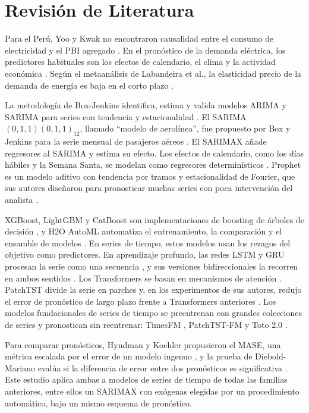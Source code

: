 \documentclass[conference]{IEEEtran}
\begin{document}
\section{Revisión de Literatura}

Para el Perú, Yoo y Kwak no encontraron causalidad entre el consumo de electricidad y el PBI agregado \cite{yoo2010}. En el pronóstico de la demanda eléctrica, los predictores habituales son los efectos de calendario, el clima y la actividad económica \cite{hong2016}. Según el metaanálisis de Labandeira et al., la elasticidad precio de la demanda de energía es baja en el corto plazo \cite{labandeira2017}.

La metodología de Box-Jenkins identifica, estima y valida modelos ARIMA y SARIMA para series con tendencia y estacionalidad \cite{box2015,hyndman2021}. El SARIMA$(0,1,1)(0,1,1)_{12}$, llamado ``modelo de aerolínea'', fue propuesto por Box y Jenkins para la serie mensual de pasajeros aéreos \cite{box2015}. El SARIMAX añade regresores al SARIMA y estima su efecto. Los efectos de calendario, como los días hábiles y la Semana Santa, se modelan como regresores determinísticos \cite{bell1983}. Prophet es un modelo aditivo con tendencia por tramos y estacionalidad de Fourier, que sus autores diseñaron para pronosticar muchas series con poca intervención del analista \cite{taylor2018}.

XGBoost, LightGBM y CatBoost son implementaciones de boosting de árboles de decisión \cite{chen2016,ke2017,prokhorenkova2018}, y H2O AutoML automatiza el entrenamiento, la comparación y el ensamble de modelos \cite{ledell2020}. En series de tiempo, estos modelos usan los rezagos del objetivo como predictores. En aprendizaje profundo, las redes LSTM y GRU procesan la serie como una secuencia \cite{hochreiter1997,cho2014}, y sus versiones bidireccionales la recorren en ambos sentidos \cite{schuster1997}. Los Transformers se basan en mecanismos de atención \cite{vaswani2017}. PatchTST divide la serie en parches y, en los experimentos de sus autores, redujo el error de pronóstico de largo plazo frente a Transformers anteriores \cite{nie2023}. Los modelos fundacionales de series de tiempo se preentrenan con grandes colecciones de series y pronostican sin reentrenar: TimesFM \cite{das2024,timesfm3}, PatchTST-FM \cite{patchtstfm} y Toto 2.0 \cite{toto2026}.

Para comparar pronósticos, Hyndman y Koehler propusieron el MASE, una métrica escalada por el error de un modelo ingenuo \cite{hyndman2006}, y la prueba de Diebold-Mariano evalúa si la diferencia de error entre dos pronósticos es significativa \cite{diebold1995}. Este estudio aplica ambas a modelos de series de tiempo de todas las familias anteriores, entre ellos un SARIMAX con exógenas elegidas por un procedimiento automático, bajo un mismo esquema de pronóstico.
\end{document}
